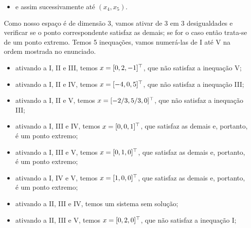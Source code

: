 \begin{questions}
\begin{solution}
\begin{itemize}
        \item e assim sucessivamente até $(x_4,x_5)$.
    \end{itemize}
\end{solution}


\begin{solution}
    Como nosso espaço é de dimensão 3, vamos ativar de 3 em 3 desigualdades e verificar se o ponto correspondente satisfaz as demais; se for o caso então trata-se de um ponto extremo. Temos 5 inequações, vamos numerá-las de I até V na ordem mostrada no enunciado.
    \begin{itemize}
        \item ativando a I, II e III, temos
        $x = [0, 2, -1]^\top$,
        que não satisfaz a inequação V;

        \item ativando a I, II e IV, temos
        $x = [-4, 0, 5]^\top$,
        que não satisfaz a inequação III;
        
        \item ativando a I, II e V, temos
        $x = [-2/3 , 5/3, 0]^\top$,
        que não satisfaz a inequação III;
        
        \item ativando a I, III e IV, temos
        $x = [0 , 0, 1]^\top$,
        que satisfaz as demais e, portanto, é um ponto extremo;
        
        \item ativando a I, III e V, temos
        $x = [0 , 1, 0]^\top$,
        que satisfaz as demais e, portanto, é um ponto extremo;
        
        \item ativando a I, IV e V, temos
        $x = [1 , 0, 0]^\top$,
        que satisfaz as demais e, portanto, é um ponto extremo;
        
        \item ativando a II, III e IV, temos um sistema sem solução;
        
        \item ativando a II, III e V, temos
        $x = [0, 2, 0]^\top$,
        que não satisfaz a inequação I;
        

\end{itemize}
\end{solution}
\end{questions}

